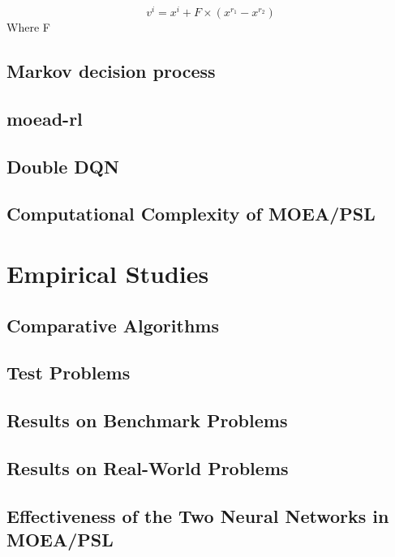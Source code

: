 \documentclass[journal]{IEEEtran}
\begin{document}
\begin{equation}
  v^{i}=x^{i}+F \times\left(x^{r_{1}}-x^{r_{2}}\right)
\end{equation}
Where F

\subsection{Markov decision process}

\subsection{moead-rl}

\subsection{Double DQN}

\subsection{Computational Complexity of MOEA/PSL}


\section{Empirical Studies}


\subsection{Comparative Algorithms}

\subsection{Test Problems}

\subsection{Results on Benchmark Problems}

\subsection{Results on Real-World Problems}

\subsection{Effectiveness of the Two Neural Networks in MOEA/PSL}\label{sec:twoNNs}
\end{document}
